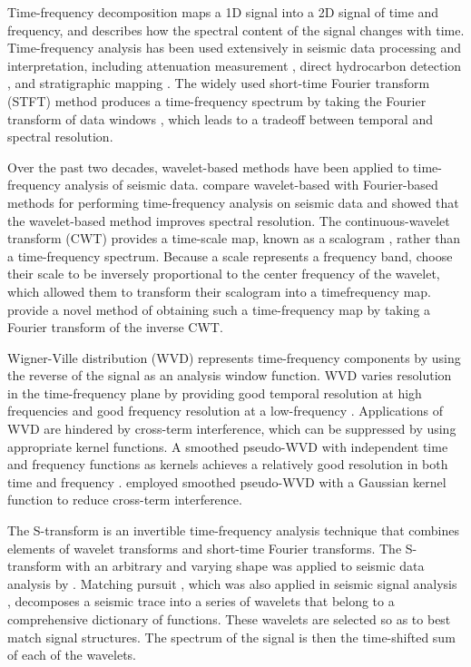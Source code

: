 Time-frequency decomposition maps a 1D signal into a 2D signal
of time and frequency, and describes how the spectral content of the
signal changes with time. Time-frequency analysis has been used
extensively in seismic data processing and interpretation, including
attenuation measurement  \cite[]{Reine2009}, direct hydrocarbon
detection \cite[]{Castagna2003}, and stratigraphic mapping
\cite[]{Partyka1999}. The widely used short-time Fourier transform
(STFT) method produces a time-frequency spectrum by taking the
Fourier transform of data windows \cite[]{Cohen1995}, which leads to a
tradeoff between temporal and spectral resolution.

Over the past two decades, wavelet-based methods have been
applied to time-frequency analysis of seismic data.  \cite{Chakraborty1995} 
compare wavelet-based with Fourier-based methods
for performing time-frequency analysis on seismic data and
showed that the wavelet-based method improves spectral resolution.
The continuous-wavelet transform (CWT) provides a time-scale
map, known as a scalogram \cite[]{Rioul1991}, rather than
a time-frequency spectrum. Because a scale represents a frequency
band, \cite{Hlawatsch1992} choose their scale
to be inversely proportional to the center frequency of the wavelet,
which allowed them to transform their scalogram into a timefrequency
map. \cite{Sinha2005} provide a novel method of obtaining
such a time-frequency map by taking a Fourier transform of
the inverse CWT.

Wigner-Ville distribution (WVD) \cite[]{Wigner1932} represents
time-frequency components by using the reverse of the signal as
an analysis window function. WVD varies resolution in the
time-frequency plane by providing good temporal resolution at high
frequencies and good frequency resolution at a low-frequency
\cite[]{Cohen1989}. Applications of WVD are hindered by cross-term
interference, which can be suppressed by using appropriate kernel
functions. A smoothed pseudo-WVD with independent time and
frequency functions as kernels achieves a relatively good resolution
in both time and frequency \cite[]{Li2008}. \cite{Wu2009} employed 
smoothed pseudo-WVD with a Gaussian kernel
function to reduce cross-term interference.

The S-transform is an invertible time-frequency analysis technique
that combines elements of wavelet transforms and short-time
Fourier transforms. The S-transform with an arbitrary and varying
shape was applied to seismic data analysis by \cite{Pinnegar2003}. 
Matching pursuit \cite[]{Mallat1993},
which was also applied in seismic signal analysis \cite[]{Chakraborty1995, Castagna2003, Liu2004, 
Liu2005, Wang2007}, decomposes a seismic trace into
a series of wavelets that belong to a comprehensive dictionary of
functions. These wavelets are selected so as to best match signal
structures. The spectrum of the signal is then the time-shifted
sum of each of the wavelets.

